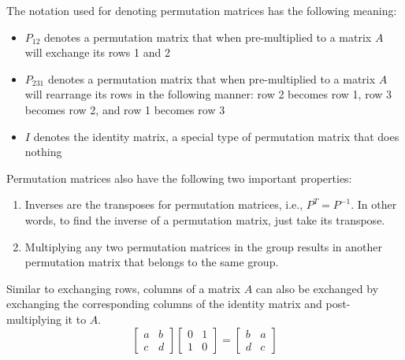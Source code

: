 \documentclass[../main.tex]{subfiles}
\begin{document}
    The notation used for denoting permutation matrices has the following meaning:
    \begin{itemize}
        \item $P_{12}$ denotes a permutation matrix that when pre-multiplied to a matrix $A$ will exchange its rows 1 and 2
        \item $P_{231}$ denotes a permutation matrix that when pre-multiplied to a matrix $A$ will rearrange its rows in the following manner: row 2 becomes row 1, row 3 becomes row 2, and row 1 becomes row 3
        \item $I$ denotes the identity matrix, a special type of permutation matrix that does nothing
    \end{itemize}
    Permutation matrices also have the following two important properties:
    \begin{enumerate}[label = Property \arabic*., itemindent = *]
        \item Inverses are the transposes for permutation matrices, i.e., $P^{T} = P^{-1}$. In other words, to find the inverse of a permutation matrix, just take its transpose.
        \item Multiplying any two permutation matrices in the group results in another permutation matrix that belongs to the same group.
    \end{enumerate}
    Similar to exchanging rows, columns of a matrix $A$ can also be exchanged by exchanging the corresponding columns of the identity matrix and post-multiplying it to $A$.
    \[
        \begin{bmatrix}
            a & b \\
            c & d
        \end{bmatrix}
        \begin{bmatrix}
            0 & 1 \\
            1 & 0
        \end{bmatrix}
        =
        \begin{bmatrix}
            b & a \\
            d & c
        \end{bmatrix}
    \]


\onlyinsubfile{\end{multicols*}}
\end{document}
